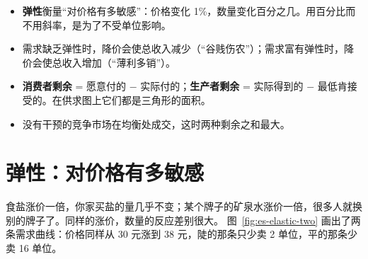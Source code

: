 
\begin{keypoints}
\begin{itemize}
  \item \textbf{弹性}衡量“对价格有多敏感”：价格变化 1\%，数量变化百分之几。用百分比而不用斜率，是为了不受单位影响。
  \item 需求缺乏弹性时，降价会使总收入减少（“谷贱伤农”）；需求富有弹性时，降价会使总收入增加（“薄利多销”）。
  \item \textbf{消费者剩余} = 愿意付的 $-$ 实际付的；\textbf{生产者剩余} = 实际得到的 $-$ 最低肯接受的。在供求图上它们都是三角形的面积。
  \item 没有干预的竞争市场在均衡处成交，这时两种剩余之和最大。
\end{itemize}
\end{keypoints}

\section{弹性：对价格有多敏感}

食盐涨价一倍，你家买盐的量几乎不变；某个牌子的矿泉水涨价一倍，很多人就换别的牌子了。同样的涨价，数量的反应差别很大。
图~\ref{fig:es-elastic-two} 画出了两条需求曲线：价格同样从 30 元涨到 38 元，陡的那条只少卖 2 单位，平的那条少卖 16 单位。

